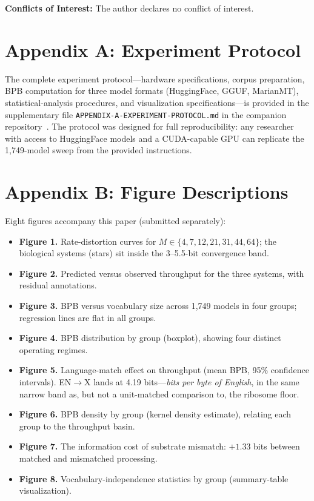 \documentclass[11pt]{article}
\begin{document}
\noindent\textbf{Conflicts of Interest:} The author declares no conflict of interest.

\section*{Appendix A: Experiment Protocol}

The complete experiment protocol---hardware specifications, corpus preparation, BPB computation for three model formats (HuggingFace, GGUF, MarianMT), statistical-analysis procedures, and visualization specifications---is provided in the supplementary file \texttt{APPENDIX-A-EXPERIMENT-PROTOCOL.md} in the companion repository~\cite{whitmer2026rlf_code}. The protocol was designed for full reproducibility: any researcher with access to HuggingFace models and a CUDA-capable GPU can replicate the 1{,}749-model sweep from the provided instructions.

\section*{Appendix B: Figure Descriptions}

Eight figures accompany this paper (submitted separately):
\begin{itemize}
    \item \textbf{Figure 1.} Rate-distortion curves for $M \in \{4, 7, 12, 21, 31, 44, 64\}$; the biological systems (stars) sit inside the 3--5.5-bit convergence band.
    \item \textbf{Figure 2.} Predicted versus observed throughput for the three systems, with residual annotations.
    \item \textbf{Figure 3.} BPB versus vocabulary size across 1{,}749 models in four groups; regression lines are flat in all groups.
    \item \textbf{Figure 4.} BPB distribution by group (boxplot), showing four distinct operating regimes.
    \item \textbf{Figure 5.} Language-match effect on throughput (mean BPB, 95\% confidence intervals). EN$\to$X lands at 4.19 bits---\emph{bits per byte of English}, in the same narrow band as, but not a unit-matched comparison to, the ribosome floor.
    \item \textbf{Figure 6.} BPB density by group (kernel density estimate), relating each group to the throughput basin.
    \item \textbf{Figure 7.} The information cost of substrate mismatch: $+1.33$ bits between matched and mismatched processing.
    \item \textbf{Figure 8.} Vocabulary-independence statistics by group (summary-table visualization).
\end{itemize}
\end{document}
